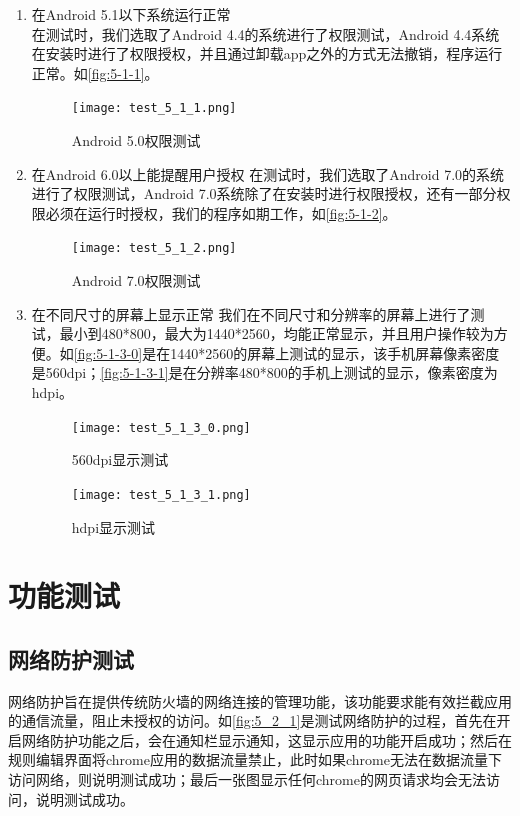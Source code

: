 \documentclass[format=final, language=chinese, degree=fyp]{hustthesis}
\begin{document}
\begin{enumerate}
	\item 在Android 5.1以下系统运行正常\\ 
在测试时，我们选取了Android 4.4的系统进行了权限测试，Android 4.4系统在安装时进行了权限授权，并且通过卸载app之外的方式无法撤销，程序运行正常。如\autoref{fig:5-1-1}。

	\begin{figure}[!h]
		\centering
		\texttt{[image: test\_5\_1\_1.png]}
		\caption{Android 5.0权限测试}\label{fig:5-1-1}
	\end{figure}
	
	\item 在Android 6.0以上能提醒用户授权
在测试时，我们选取了Android 7.0的系统进行了权限测试，Android  7.0系统除了在安装时进行权限授权，还有一部分权限必须在运行时授权，我们的程序如期工作，如\autoref{fig:5-1-2}。
	\begin{figure}[!h]
		\centering
		\texttt{[image: test\_5\_1\_2.png]}
		\caption{Android 7.0权限测试}\label{fig:5-1-2}
	\end{figure}
	
	\item 在不同尺寸的屏幕上显示正常
我们在不同尺寸和分辨率的屏幕上进行了测试，最小到480*800，最大为1440*2560，均能正常显示，并且用户操作较为方便。如\autoref{fig:5-1-3-0}是在1440*2560的屏幕上测试的显示，该手机屏幕像素密度是560dpi；\autoref{fig:5-1-3-1}是在分辨率480*800的手机上测试的显示，像素密度为hdpi。

\begin{figure}[!htb]
\centering
{}
	\texttt{[image: test\_5\_1\_3\_0.png]}
	\caption{560dpi显示测试}\label{fig:5-1-3-0}
\endminipage
\hspace{1cm}
	\texttt{[image: test\_5\_1\_3\_1.png]}
	\caption{hdpi显示测试}\label{fig:5-1-3-1}
\endminipage
\end{figure}
	
\end{enumerate}

\section{功能测试}

\subsection{网络防护测试}

网络防护旨在提供传统防火墙的网络连接的管理功能，该功能要求能有效拦截应用的通信流量，阻止未授权的访问。如\autoref{fig:5_2_1}是测试网络防护的过程，首先在开启网络防护功能之后，会在通知栏显示通知，这显示应用的功能开启成功；然后在规则编辑界面将chrome应用的数据流量禁止，此时如果chrome无法在数据流量下访问网络，则说明测试成功；最后一张图显示任何chrome的网页请求均会无法访问，说明测试成功。
\end{document}
